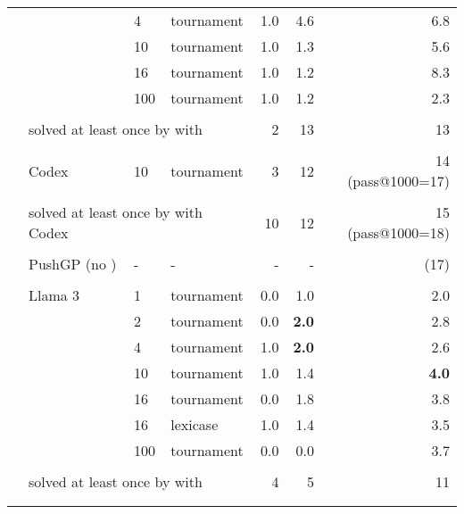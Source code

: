 \begin{table}[t]
\begin{adjustbox}{max width=.92\textwidth}
\begin{DIFnomarkup}
\begin{tabular}{llllrrr}
       &        & 4   &         tournament &     1.0 &      4.6 &       6.8 \\
       &        & 10  &         tournament &     1.0 &      1.3 &       5.6 \\
       &        & 16  &         tournament &     1.0 &      1.2 &       8.3 \\
       &        & 100 &         tournament &     1.0 &      1.2 &       2.3 \\[1pt]
\cline{3-7}\\[-8pt]
       & \multicolumn{3}{l}{solved at least once by \method{} with \gpt{}}   & 2 &       13 &       13 \\[1pt]
% 
\cline{2-7}\\[-8pt]
   & Codex  & 10 & tournament &     3 &       12 &   14 (pass@1000=17)\\[1pt]
\cline{3-7}\\[-8pt]
       & \multicolumn{3}{l}{solved at least once by \method{} with Codex}   & 10 &       12 &        15 (pass@1000=18) \\[1pt]
\cline{2-7}\\[-8pt]
   &  PushGP (no \method{}) & -   &    -            &       - &        - &      (17)\\[1pt]
\cline{2-7}\\[-8pt]
        & Llama 3 & 1   &         tournament &     0.0 &      1.0 &       2.0 \\
       &        & 2   &         tournament &     0.0 &      \textbf{2.0} &       2.8 \\
       &        & 4   &         tournament &     1.0 &     \textbf{ 2.0} &       2.6 \\
       &        & 10  &         tournament &     1.0 &      1.4 &       \textbf{4.0} \\
       &        & 16  &         tournament &     0.0 &      1.8 &       3.8 \\
       &        & 16  &           lexicase &    1.0 &      1.4 &       3.5 \\
       &        & 100 &         tournament &     0.0 &      0.0 &       3.7 \\[1pt]
\cline{3-7}\\[-8pt]
       & \multicolumn{3}{l}{solved at least once by \method{} with \llama{}}  & 4 &        5 &       11  \\
\bottomrule
\\ %
\\ %
\end{tabular}
\end{DIFnomarkup} %
\end{adjustbox}
\end{table}



